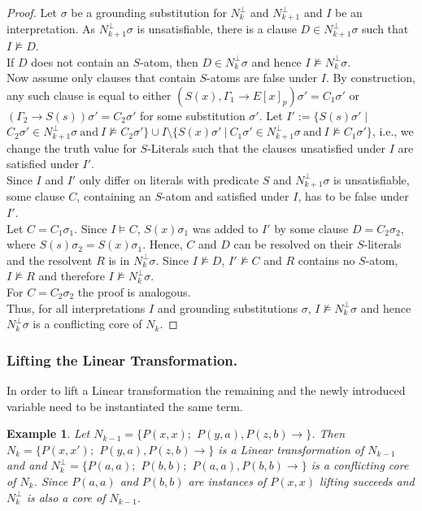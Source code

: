 \documentclass{llncs}
\newcommand{\sat}{\vDash}
\newcommand{\unsat}{\not \vDash}
\newcommand{\imp}{\rightarrow}
\newtheorem{exmp}{Example}
\begin{document}
\begin{proof}
Let  $\sigma$ be a grounding substitution for $N^\bot_{k}$ and $N^\bot_{k+1}$ and $I$ be an interpretation. 
As  $N^\bot_{k+1}\sigma$ is unsatisfiable, there is a clause $D\in N^\bot_{k+1}\sigma$ such that $I\unsat D$. \\
If $D$ does not contain an $S$-atom, then $D \in N^\bot_{k}\sigma$ and hence $I\unsat N^\bot_{k}\sigma$.\\
Now assume only clauses that contain $S$-atoms are false under $I$. 
By construction, any such clause is equal to either  $(S(x),\Gamma_1 \imp E[x]_{p})\sigma'=C_1\sigma'$ or $(\Gamma_2 \imp S(s))\sigma'=C_2\sigma'$ for some substitution $\sigma'$.
Let $I' :=  \{S(s)\sigma' \mid $ $C_2\sigma' \in N^\bot_{k+1}\sigma \mathrm{ ~and~ } I\unsat C_2\sigma' \} \cup I \setminus \{ S(x)\sigma' ~\vert~  C_1\sigma' \in N^\bot_{k+1}\sigma \mathrm{ ~and~ } I\unsat C_1\sigma' \}$, i.e.,
we change the truth value for $S$-Literals such that the clauses unsatisfied under $I$ are satisfied under $I'$.\\
Since  $I$ and $I'$ only differ on literals with predicate $S$ and $N^\bot_{k+1}\sigma$ is unsatisfiable, some clause $C$, containing an $S$-atom and satisfied under $I$, has to be false under $I'$.\\
Let $C=C_1\sigma_1$. Since $I\sat C$, $S(x)\sigma_1$ was added to $I'$ by some clause $D =C_2\sigma_2$, where $S(s)\sigma_2 = S(x)\sigma_1$.
Hence, $C$ and $D$ can be resolved on their $S$-literals and the resolvent $R$ is in $N^\bot_{k}\sigma$.
Since $I\unsat D$, $I'\unsat C$ and $R$ contains no $S$-atom, $I\unsat R$ and therefore $I\unsat N^\bot_{k}\sigma$.\\
For $C=C_2\sigma_2$ the proof is analogous.\\
Thus, for all interpretations $I$ and grounding substitutions $\sigma$, $I\unsat N^\bot_{k}\sigma$ and hence $N^\bot_{k}\sigma$ is a conflicting core of $N_k$.
 \end{proof}

\subsubsection{Lifting the Linear Transformation.}
In order to lift a Linear transformation the remaining and the newly introduced variable  
need to be instantiated the same term. 

\begin{exmp}\label{liftLinEx}
Let $N_{k-1} = \{ P(x,x);$ $P(y,a),P(z,b) \imp \}$. 
Then $N_k=  \{ P(x,x');$ $P(y,a),P(z,b) \imp \}$ is a Linear transformation of $N_{k-1} $ and
and  $N^\bot_k=\{ P(a,a);$ $P(b,b);$ $P(a,a),P(b,b)\imp\}$ is a conflicting core of $N_k$.
Since $P(a,a)$ and $P(b,b)$ are instances of $P(x,x)$ lifting succeeds and $N^\bot_k$ is also a core of $N_{k-1} $.
\end{exmp} 
\end{document}
